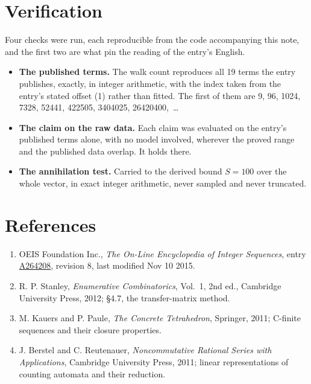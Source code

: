\documentclass[11pt]{article}
\theoremstyle{definition}
\begin{document}
\section{Verification}

Four checks were run, each reproducible from the code accompanying this note, and the first two are what pin the reading of the entry's English.

\begin{itemize}

\item {\bfseries The published terms.} The walk count reproduces all 19 terms the entry publishes, exactly, in integer arithmetic, with the index taken from the entry's stated offset (1) rather than fitted. The first of them are 9, 96, 1024, 7328, 52441, 422505, 3404025, 26420400,~\dots

\item {\bfseries The claim on the raw data.} Each claim was evaluated on the entry's published terms alone, with no model involved, wherever the proved range and the published data overlap. It holds there.

\item {\bfseries The annihilation test.} Carried to the derived bound $S = 100$ over the whole vector, in exact integer arithmetic, never sampled and never truncated.

\end{itemize}

\section{References}

\begin{enumerate}

\item OEIS Foundation Inc., \emph{The On-Line Encyclopedia of Integer Sequences}, entry \href{https://oeis.org/A264208}{A264208}, revision 8, last modified Nov 10 2015.

\item R. P. Stanley, \emph{Enumerative Combinatorics}, Vol.~1, 2nd ed., Cambridge University Press, 2012; \S4.7, the transfer-matrix method.

\item M. Kauers and P. Paule, \emph{The Concrete Tetrahedron}, Springer, 2011; C-finite sequences and their closure properties.

\item J. Berstel and C. Reutenauer, \emph{Noncommutative Rational Series with Applications}, Cambridge University Press, 2011; linear representations of counting automata and their reduction.

\end{enumerate}
\end{document}
